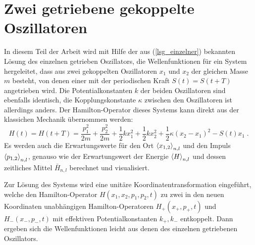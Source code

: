\section{Zwei getriebene gekoppelte Oszillatoren}
  In diesem Teil der Arbeit wird mit Hilfe der aus (\ref{lsg_einzelner}) bekannten Lösung des einzelnen getrieben Oszillators, die Wellenfunktionen für ein System hergeleitet, dass aus zwei gekoppelten Oszillatoren $x_1$ und $x_2$ der gleichen Masse $m$ besteht, von denen einer mit der periodischen Kraft $S(t) = S(t+T)$ angetrieben wird.
  Die Potentialkonstanten $k$ der beiden Oszillatoren sind ebenfalls identisch, die Kopplungskonstante $\kappa$ zwischen den Oszillatoren ist allerdings anders.
  Der Hamilton-Operator dieses Systems kann direkt aus der klassichen Mechanik übernommen werden:
  \begin{equation}
    H(t) = H(t+T) = \frac{p_1^2}{2m} + \frac{p_2^2}{2m} + \frac 1 2 kx_1^2 + \frac 1 2 kx_2^2 + \frac 1 2 \kappa(x_2-x_1)^2 - S(t)x_1 \; .
  \end{equation}
  Es werden auch die Erwartungswerte für  den Ort $\braket{x_{1,2}}_{n,l}$ und den Impuls $\braket{p_{1,2}}_{n,l}$, genauso wie der Erwartungswert der Energie $\braket{H}_{n,l}$ und dessen zeitliches Mittel $\bar{H}_{n,l}$ berechnet und visualisiert.

  Zur Lösung des Systems wird eine unitäre Koordinatentransformation eingeführt, welche den Hamilton-Operator $H(x_1,x_2,p_1,p_2,t)$ zu zwei in den neuen Koordinaten unabhängigen Hamilton-Operatoren $H_+(x_+,p_+,t)$ und $H_-(x_-,p_-,t)$ mit effektiven Potentialkonstanten $k_+,k_-$ entkoppelt.
  Dann ergeben sich die Wellenfunktionen leicht aus denen des einzelnen getriebenen Oszillators.



